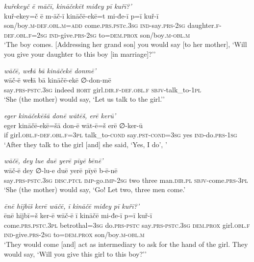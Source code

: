 \ea \label{ŽE.75}
\textit{kuřekeyč ē māčī, kināčekēt miđey pī kuřī?’} \\ 
\gll kuř-ekey=č ē m-āč-ī kināčē-ekē=t mi-đe-ī p=ī kuř-ī \\ 
 son/boy\textsc{.m}\textsc{-def}\textsc{.obl}\textsc{.m}\textsc{=add} come\textsc{.prs}\textsc{.pst}c\textsc{.3sg} \textsc{ind-}say\textsc{.prs}-\textsc{2sg} daughter\textsc{.f}\textsc{-def}\textsc{.obl}\textsc{.f}\textsc{=\textsc{2sg}} \textsc{ind-}give\textsc{.prs}-\textsc{2sg} to=\textsc{dem.prox} son/boy\textsc{.m}\textsc{-obl}\textsc{.m} \\ 
\glt `The boy comes. [Addressing her grand son] you would say [to her mother], ‘Will you give your daughter to this boy [in marriage]?’'
\z 
 
\ea \label{ŽE.76}
\textit{wāčē, weɫā bā kināčekē donmē’} \\ 
\gll wāč-ē weɫā bā kināčē-ekē ∅-don-mē \\ 
 say\textsc{.prs-pstc}\textsc{.3sg} indeed \textsc{hort} girl\textsc{.dir}\textsc{.f}\textsc{-def}\textsc{.obl}\textsc{.f} \textsc{sbjv-}talk\_to\textsc{-1pl} \\ 
\glt `She (the mother) would say, ‘Let us talk to the girl.’'
\z 
 
\ea \label{ŽE.77}
\textit{eger kināčekēšā donē wātēš, erē kerū’} \\ 
\gll eger kināčē-ekē=šā don-ē wāt-ē=š erē ∅-ker-ū \\ 
 if girl\textsc{.obl}\textsc{.f}\textsc{-def}\textsc{.obl}\textsc{.f}\textsc{=3pl} talk\_to\textsc{-cond} say\textsc{.pst}\textsc{-cond}\textsc{=3sg} yes \textsc{ind-}do\textsc{.prs}\textsc{-\textsc{1sg}} \\ 
\glt `After they talk to the girl [and] she said, ‘Yes, I do’, '
\z 
 
\ea \label{ŽE.78}
\textit{wāčē, dey lue duē yerē pīyē bēnē’} \\ 
\gll wāč-ē dey ∅-lu-e duē yerē pīyē b-ē-nē \\ 
 say\textsc{.prs-pstc}\textsc{.3sg} \textsc{disc.}\textsc{ptcl} \textsc{imp-}go.\textsc{imp-}\textsc{2sg} two three man\textsc{.dir}\textsc{.pl} \textsc{sbjv-}come\textsc{.prs}\textsc{-3pl} \\ 
\glt `She (the mother) would say, ‘Go! Let two, three men come.'
\z 
 
\ea \label{ŽE.80}
\textit{ēnē hījbīš kerē wāčē, ī kināčē miđey pī kuřī?’} \\ 
\gll ēnē hījbī=š ker-ē wāč-ē ī kināčē mi-đe-ī p=ī kuř-ī \\ 
 come\textsc{.prs}\textsc{.pstc}\textsc{.3pl} betrothal\textsc{=3sg} do\textsc{.prs}\textsc{-pstc} say\textsc{.prs-pstc}\textsc{.3sg} \textsc{dem.prox} girl\textsc{.obl}\textsc{.f} \textsc{ind-}give\textsc{.prs}-\textsc{2sg} to=\textsc{dem.prox} son/boy\textsc{.m}\textsc{-obl}\textsc{.m} \\ 
\glt `They would come [and] act as intermediary to ask for the hand of the girl. They would say, ‘Will you give this girl to this boy?’'
\z 
 
